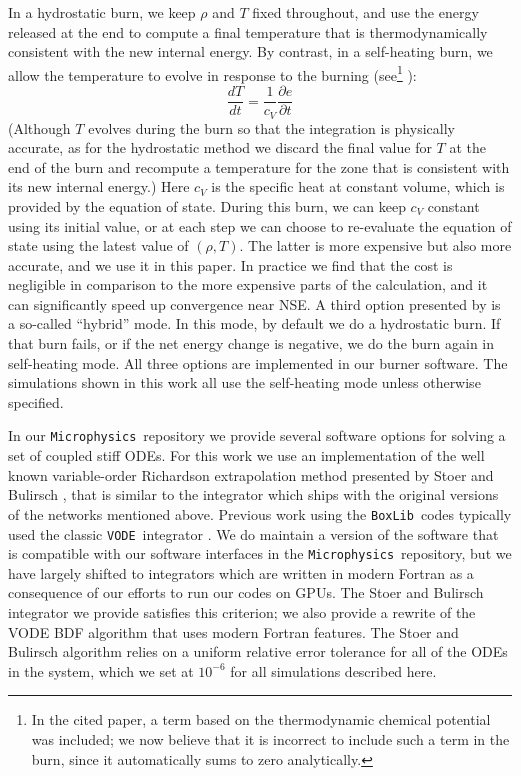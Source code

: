 \documentclass[twocolumn,numberedappendix]{../aastex6}
\newcommand{\boxlib}{\texttt{BoxLib}}
\newcommand{\microphysics}{\texttt{Microphysics}}
\newcommand{\vode}{\texttt{VODE}}
\begin{document}
In a hydrostatic burn, we keep $\rho$ and $T$ fixed throughout, and use
the energy released at the end to compute a final temperature that is
thermodynamically consistent with the new internal energy. By contrast,
in a self-heating burn, we allow the temperature to evolve in response
to the burning (see\footnote{In the cited paper, a term based on the
thermodynamic chemical potential was included; we now believe
that it is incorrect to include such a term in the burn, since it
automatically sums to zero analytically.} \citet{maestro3}):
\begin{equation}
  \frac{dT}{dt} = \frac{1}{c_V}\frac{\partial e}{\partial t}
\end{equation}
(Although $T$ evolves during the burn so that the integration is physically
accurate, as for the hydrostatic method we discard the final value
for $T$ at the end of the burn and recompute a temperature for the zone that is
consistent with its new internal energy.) Here $c_V$ is the specific heat at
constant volume, which is provided by the equation of state.  During this burn,
we can keep $c_V$ constant using its initial value, or at each step we
can choose to re-evaluate the equation of state using the latest value of $(\rho, T)$.
The latter is more expensive but also more accurate, and we use it in this paper.
In practice we find that the cost is negligible in comparison to the more expensive
parts of the calculation, and it can significantly speed up convergence near NSE.
A third option presented by \citet{raskin:2010} is a so-called ``hybrid'' mode.
In this mode, by default we do a hydrostatic burn. If that burn fails, or if the net
energy change is negative, we do the burn again in self-heating mode. All three options
are implemented in our burner software. The simulations shown in this work all
use the self-heating mode unless otherwise specified.

In our \microphysics\ repository we provide several software options for
solving a set of coupled stiff ODEs. For this work we use an implementation of
the well known variable-order Richardson extrapolation method presented by Stoer and
Bulirsch \cite{stoer:1980}, that is similar to the integrator which ships with
the original versions of the networks mentioned above. Previous work using the \boxlib\
codes typically used the classic \vode\ integrator \cite{vode}. We do maintain a version
of the software that is compatible with our software interfaces in the \microphysics\
repository, but we have largely shifted to integrators which are written in modern
Fortran as a consequence of our efforts to run our codes on GPUs. The Stoer and Bulirsch
integrator we provide satisfies this criterion; we also provide a rewrite of the VODE
BDF algorithm that uses modern Fortran features. The Stoer and Bulirsch algorithm
relies on a uniform relative error tolerance for all of the ODEs in the system, which
we set at $10^{-6}$ for all simulations described here.
\end{document}
